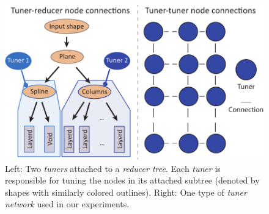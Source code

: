 \begin{figure}[h]
\centering
\includegraphics[width=0.7\linewidth]{figure/tunedrt.pdf}
\caption{ 
	Left: Two \emph{tuners} attached to a \emph{reducer tree}. Each \emph{tuner} is responsible for tuning the nodes in its attached subtree (denoted by shapes with similarly colored outlines). 
	Right: One type of \emph{tuner network} used in our experiments.}
\label{fig:combine}
\end{figure}
